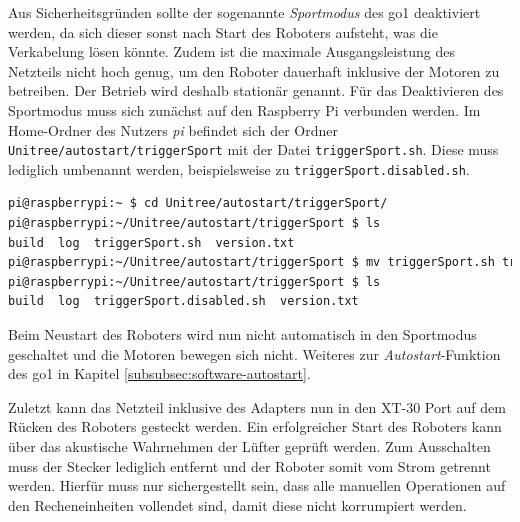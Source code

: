 Aus Sicherheitsgründen sollte der sogenannte \emph{Sportmodus} des \gls{go1} deaktiviert werden, da sich dieser sonst nach
Start des Roboters aufsteht, was die Verkabelung lösen könnte.
Zudem ist die maximale Ausgangsleistung des Netzteils nicht hoch genug, um den Roboter dauerhaft inklusive der Motoren
zu betreiben.
Der Betrieb wird deshalb stationär genannt.
Für das Deaktivieren des Sportmodus muss sich zunächst auf den Raspberry Pi verbunden werden.
Im Home-Ordner des Nutzers \emph{pi} befindet sich der Ordner \texttt{Unitree/autostart/triggerSport} mit der Datei
\texttt{trig\-ger\-Sport.sh}.
Diese muss lediglich umbenannt werden, beispielsweise zu \texttt{trig\-ger\-Sport.dis\-a\-bled.sh}.

\begin{lstlisting}[language=sh,label=lst:disable-triggersport]
pi@raspberrypi:~ $ cd Unitree/autostart/triggerSport/
pi@raspberrypi:~/Unitree/autostart/triggerSport $ ls
build  log  triggerSport.sh  version.txt
pi@raspberrypi:~/Unitree/autostart/triggerSport $ mv triggerSport.sh triggerSport.disabled.sh
pi@raspberrypi:~/Unitree/autostart/triggerSport $ ls
build  log  triggerSport.disabled.sh  version.txt
\end{lstlisting}

\noindent Beim Neustart des Roboters wird nun nicht automatisch in den Sportmodus geschaltet und die Motoren bewegen sich nicht.
Weiteres zur \emph{Autostart}-Funktion des \gls{go1} in Kapitel \ref{subsubsec:software-autostart}.

Zuletzt kann das Netzteil inklusive des Adapters nun in den XT-30 Port auf dem Rücken des Roboters gesteckt werden.
Ein erfolgreicher Start des Roboters kann über das akustische Wahrnehmen der Lüfter geprüft werden.
Zum Ausschalten muss der Stecker lediglich entfernt und der Roboter somit vom Strom getrennt werden.
Hierfür muss nur sichergestellt sein, dass alle manuellen Operationen auf den Recheneinheiten vollendet sind, damit diese
nicht korrumpiert werden.

